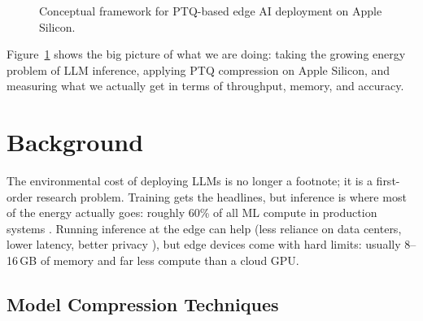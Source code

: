 \documentclass[journal]{IEEEtran}
\begin{document}
\begin{figure}[htbp]
\caption{Conceptual framework for PTQ-based edge AI deployment on Apple Silicon.}
\label{fig:framework}
\end{figure}

Figure~\ref{fig:framework} shows the big picture of what we are doing: taking the growing energy problem of LLM inference, applying PTQ compression on Apple Silicon, and measuring what we actually get in terms of throughput, memory, and accuracy.

\section{Background}

The environmental cost of deploying LLMs is no longer a footnote; it is a first-order research problem. Training gets the headlines, but inference is where most of the energy actually goes: roughly 60\% of all ML compute in production systems \cite{patterson2021carbon}. Running inference at the edge can help (less reliance on data centers, lower latency, better privacy \cite{shi2016edge}), but edge devices come with hard limits: usually 8--16\,GB of memory and far less compute than a cloud GPU.

\subsection{Model Compression Techniques}
\end{document}
